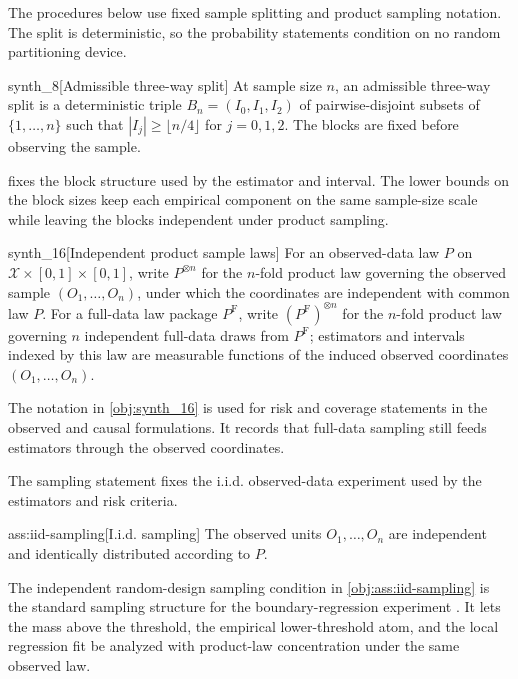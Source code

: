 \documentclass[11pt]{article}
\begin{document}
The procedures below use fixed sample splitting and product sampling notation. The split is deterministic, so the probability statements condition on no random partitioning device.

\begin{definitionv}{synth_8}[Admissible three-way split]
At sample size \(n\), an admissible three-way split is a deterministic triple \(B_n=(I_0,I_1,I_2)\) of pairwise-disjoint subsets of \(\{1,\ldots,n\}\) such that \(|I_j|\geq\lfloor n/4\rfloor\) for \(j=0,1,2\). The blocks are fixed before observing the sample.
\end{definitionv}

 fixes the block structure used by the estimator and interval. The lower bounds on the block sizes keep each empirical component on the same sample-size scale while leaving the blocks independent under product sampling.

\begin{definitionv}{synth_16}[Independent product sample laws]
For an observed-data law \(P\) on \(\mathcal X\times[0,1]\times[0,1]\), write \(P^{\otimes n}\) for the \(n\)-fold product law governing the observed sample \((O_1,\ldots,O_n)\), under which the coordinates are independent with common law \(P\). For a full-data law package \(P^{\mathrm F}\), write \((P^{\mathrm F})^{\otimes n}\) for the \(n\)-fold product law governing \(n\) independent full-data draws from \(P^{\mathrm F}\); estimators and intervals indexed by this law are measurable functions of the induced observed coordinates \((O_1,\ldots,O_n)\).
\end{definitionv}

The notation in \cref{obj:synth_16} is used for risk and coverage statements in the observed and causal formulations. It records that full-data sampling still feeds estimators through the observed coordinates.

The sampling statement fixes the i.i.d. observed-data experiment used by the estimators and risk criteria.

\begin{assumptionv}{ass:iid-sampling}[I.i.d. sampling]
The observed units \(O_1,\ldots,O_n\) are independent and identically distributed according to \(P\).
\end{assumptionv}

The independent random-design sampling condition in \cref{obj:ass:iid-sampling} is the standard sampling structure for the boundary-regression experiment \citep{Gaiffas2005DegenerateDesign}. It lets the mass above the threshold, the empirical lower-threshold atom, and the local regression fit be analyzed with product-law concentration under the same observed law.
\end{document}
